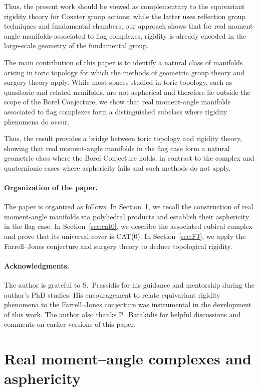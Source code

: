 \documentclass[11pt,a4paper]{article}
\numberwithin{equation}{section}
\theoremstyle{named}
\begin{document}
Thus, the present work should be viewed as complementary to the equivariant rigidity theory for Coxeter group actions: while the latter uses reflection group techniques and fundamental chambers, our approach shows that for real moment-angle manifolds associated to flag complexes, rigidity is already encoded in the large-scale geometry of the fundamental group.

The main contribution of this paper is to identify a natural class of manifolds arising in toric topology for which the methods of geometric group theory and surgery theory apply. While most spaces studied in toric topology, such as quasitoric and related manifolds, are not aspherical and therefore lie outside the scope of the Borel Conjecture, we show that real moment-angle manifolds associated to flag complexes form a distinguished subclass where rigidity phenomena do occur.

Thus, the result provides a bridge between toric topology and rigidity theory, showing that real moment-angle manifolds in the flag case form a natural geometric class where the Borel Conjecture holds, in contrast to the complex and quaternionic cases where asphericity fails and such methods do not apply.

\paragraph*{Organization of the paper.}

The paper is organized as follows. In Section~\ref{sec:davis}, we recall the construction of real moment-angle manifolds via polyhedral products and establish their asphericity in the flag case. In Section~\ref{sec:cat0}, we describe the associated cubical complex and prove that its universal cover is CAT(0). In Section~\ref{sec:FJ}, we apply the Farrell--Jones conjecture and surgery theory to deduce topological rigidity.

\paragraph*{Acknowledgments.}
The author is grateful to S.~Prassidis for his guidance and mentorship during the author’s PhD studies. His encouragement to relate equivariant rigidity phenomena to the Farrell--Jones conjecture was instrumental in the development of this work. The author also thanks P.~Batakidis for helpful discussions and comments on earlier versions of this paper.

\section{Real moment--angle complexes and asphericity}
\label{sec:davis}
\end{document}
